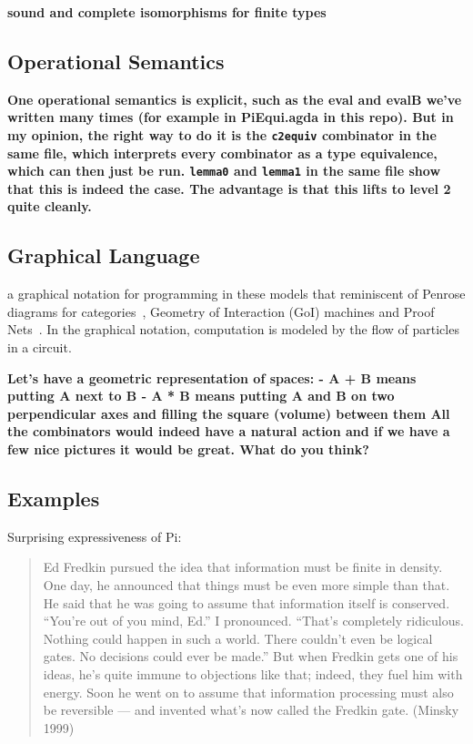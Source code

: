\documentclass{article}
\newcommand{\amr}[1]{\fbox{Amr says:} \textbf{#1}}
\newcommand{\jc}[1]{\fbox{Jacques says:} \textbf{#1}}
\begin{document}
\amr{sound and complete isomorphisms for finite types}

\subsection{Operational Semantics} 

\jc{One operational semantics is explicit, such as the eval and 
evalB we've written many times (for example in PiEqui.agda in
this repo). But in my opinion, the right way to do it is the
\texttt{c2equiv} combinator in the same file, which interprets
every combinator as a type equivalence, which can then just be
run. \texttt{lemma0} and \texttt{lemma1} in the same file show
that this is indeed the case. The advantage is that this lifts
to level 2 quite cleanly.}

\subsection{Graphical Language} 

a graphical notation for programming in these models that reminiscent
of Penrose diagrams for categories~\cite{selinger-graphical}, Geometry
of Interaction (GoI) machines and Proof
Nets~\cite{Mackie2011,DBLP:conf/popl/Mackie95}. In the graphical
notation, computation is modeled by the flow of particles in a
circuit.

\amr{
  Let’s have a geometric representation of spaces:
- A + B means putting A next to B
- A * B means putting A and B on two perpendicular axes and filling
the square (volume) between them
All the combinators would indeed have a natural action and if we have
a few nice pictures it would be great. What do you think? }

\subsection{Examples} 

Surprising expressiveness of Pi:

\begin{quote}
  Ed Fredkin pursued the idea that information must be finite in
  density. One day, he announced that things must be even more simple
  than that. He said that he was going to assume that information
  itself is conserved. “You’re out of you mind, Ed.” I
  pronounced. “That’s completely ridiculous. Nothing could happen in
  such a world. There couldn’t even be logical gates. No decisions
  could ever be made.” But when Fredkin gets one of his ideas, he’s
  quite immune to objections like that; indeed, they fuel him with
  energy. Soon he went on to assume that information processing must
  also be reversible — and invented what’s now called the Fredkin
  gate. (Minsky 1999)
\end{quote}
\end{document}
